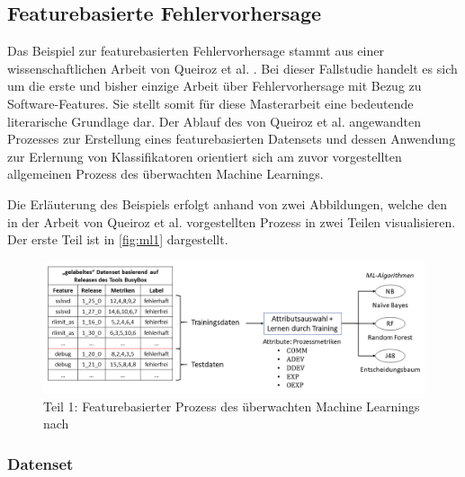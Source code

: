 \subsection*{Featurebasierte Fehlervorhersage}

Das Beispiel zur featurebasierten Fehlervorhersage stammt aus einer wissenschaftlichen Arbeit von Queiroz et al. \cite{Queiroz2016}. Bei dieser Fallstudie handelt es sich um die erste und bisher einzige Arbeit über Fehlervorhersage mit Bezug zu Software-Features. Sie stellt somit für diese Masterarbeit eine bedeutende literarische Grundlage dar. Der Ablauf des von Queiroz et al. angewandten Prozesses zur Erstellung eines featurebasierten Datensets und dessen Anwendung zur Erlernung von Klassifikatoren orientiert sich am zuvor vorgestellten allgemeinen Prozess des überwachten Machine Learnings.

Die Erläuterung des Beispiels erfolgt anhand von zwei Abbildungen, welche den in der Arbeit von Queiroz et al. vorgestellten Prozess in zwei Teilen visualisieren. Der erste Teil ist in \autoref{fig:ml1} dargestellt.

\begin{figure}[t]
    \centering
    \captionsetup{justification=centering}
    \includegraphics[width=\textwidth]{images/ML1}
    \caption{Teil 1: Featurebasierter Prozess des überwachten Machine Learnings nach \cite{Queiroz2016}}\label{fig:ml1}
\end{figure}

\subsubsection*{Datenset}


